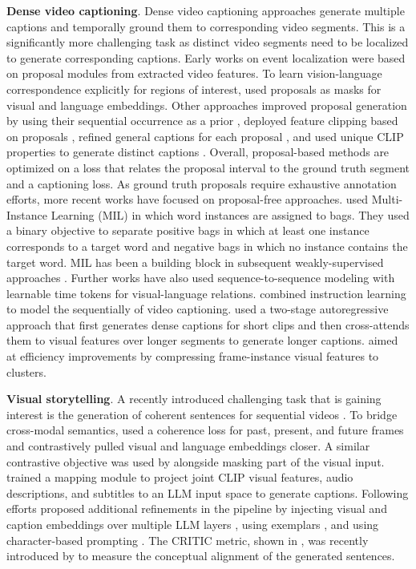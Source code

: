 \noindent
\textbf{Dense video captioning}. Dense video captioning approaches generate multiple captions and temporally ground them to corresponding video segments. This is a significantly more challenging task as distinct video segments need to be localized to generate corresponding captions. Early works on event localization  were based on proposal modules from extracted video features. To learn vision-language correspondence explicitly for regions of interest,  used proposals as masks for visual and language embeddings. Other approaches improved proposal generation by using their sequential occurrence as a prior , deployed feature clipping based on proposals , refined general captions for each proposal , and used unique CLIP properties to generate distinct captions . Overall, proposal-based methods are optimized on a loss that relates the proposal interval to the ground truth segment and a captioning loss. As ground truth proposals require exhaustive annotation efforts, more recent works have focused on proposal-free approaches.  used Multi-Instance Learning (MIL) in which word instances are assigned to bags. They used a binary objective to separate positive bags in which at least one instance corresponds to a target word and negative bags in which no instance contains the target word. MIL has been a building block in subsequent weakly-supervised approaches . Further works  have also used sequence-to-sequence modeling with learnable time tokens for visual-language relations.  combined instruction learning to model the sequentially of video captioning.  used a two-stage autoregressive approach that first generates dense captions for short clips and then cross-attends them to visual features over longer segments to generate longer captions.  aimed at efficiency improvements by compressing frame-instance visual features to clusters.


\noindent
\textbf{Visual storytelling}. A recently introduced challenging task that is gaining interest is the generation of coherent sentences for sequential videos . To bridge cross-modal semantics,  used a coherence loss for past, present, and future frames and contrastively pulled visual and language embeddings closer. A similar contrastive objective was used by  alongside masking part of the visual input.  trained a mapping module to project joint CLIP visual features, audio descriptions, and subtitles to an LLM input space to generate captions. Following efforts proposed additional refinements in the pipeline by injecting visual and caption embeddings over multiple LLM layers , using exemplars , and using character-based prompting . The CRITIC metric, shown in , was recently introduced by  to measure the conceptual alignment of the generated sentences.


